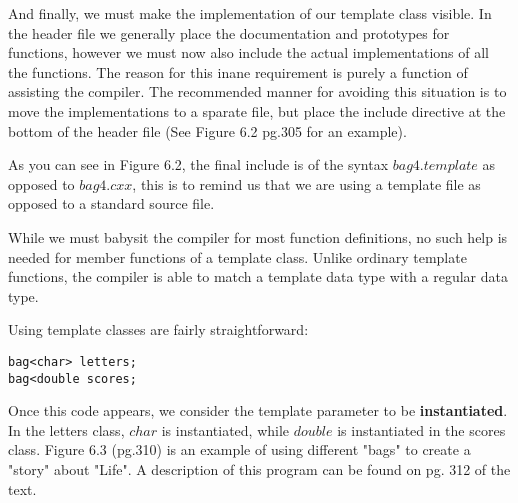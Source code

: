 And finally, we must make the implementation of our template class visible. In the header file we generally place the documentation and prototypes for functions, however we must now also include the actual implementations of all the functions. The reason for this inane requirement is purely a function of assisting the compiler. The recommended manner for avoiding this situation is to move the implementations to a sparate file, but place the include directive at the bottom of the header file (See Figure 6.2 pg.305 for an example).

As you can see in Figure 6.2, the final include is of the syntax $bag4.template$ as opposed to $bag4.cxx$, this is to remind us that we are using a template file as opposed to a standard source file.

While we must babysit the compiler for most function definitions, no such help is needed for member functions of a template class. Unlike ordinary template functions, the compiler is able to match a template data type with a regular data type.

Using template classes are fairly straightforward:
\begin{lstlisting}
bag<char> letters;
bag<double scores;
\end{lstlisting}
Once this code appears, we consider the template parameter to be \textbf{instantiated}. In the letters class, $char$ is instantiated, while $double$ is instantiated in the scores class. Figure 6.3 (pg.310) is an example of using different "bags" to create a "story" about "Life". A description of this program can be found on pg. 312 of the text.


